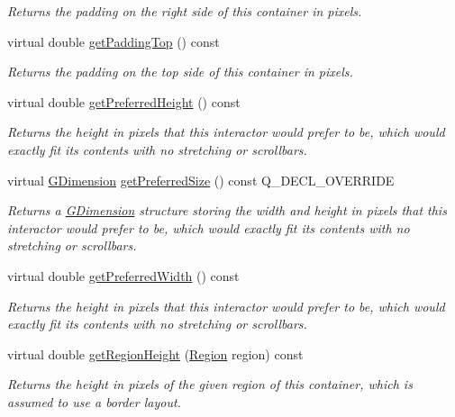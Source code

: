 \begin{DoxyCompactItemize}
\begin{DoxyCompactList}\small\item\em Returns the padding on the right side of this container in pixels. \end{DoxyCompactList}\item 
virtual double \mbox{\hyperlink{classGContainer_ada97c35b2f3366886a49d63fff9d7bd4}{get\+Padding\+Top}} () const
\begin{DoxyCompactList}\small\item\em Returns the padding on the top side of this container in pixels. \end{DoxyCompactList}\item 
virtual double \mbox{\hyperlink{classGInteractor_a747de0961653847bdc6615dbf756d715}{get\+Preferred\+Height}} () const
\begin{DoxyCompactList}\small\item\em Returns the height in pixels that this interactor would prefer to be, which would exactly fit its contents with no stretching or scrollbars. \end{DoxyCompactList}\item 
virtual \mbox{\hyperlink{classGDimension}{G\+Dimension}} \mbox{\hyperlink{classGContainer_a21904b305edacd8f871d6951cb8d3fa5}{get\+Preferred\+Size}} () const Q\+\_\+\+D\+E\+C\+L\+\_\+\+O\+V\+E\+R\+R\+I\+DE
\begin{DoxyCompactList}\small\item\em Returns a \mbox{\hyperlink{classGDimension}{G\+Dimension}} structure storing the width and height in pixels that this interactor would prefer to be, which would exactly fit its contents with no stretching or scrollbars. \end{DoxyCompactList}\item 
virtual double \mbox{\hyperlink{classGInteractor_a82bca31d37700fb0e35d2743352efd5e}{get\+Preferred\+Width}} () const
\begin{DoxyCompactList}\small\item\em Returns the height in pixels that this interactor would prefer to be, which would exactly fit its contents with no stretching or scrollbars. \end{DoxyCompactList}\item 
virtual double \mbox{\hyperlink{classGContainer_a164d248057318961e7f2abc8c3477d63}{get\+Region\+Height}} (\mbox{\hyperlink{classGContainer_a81a01a86de31071a92e6cce0bab9bc4b}{Region}} region) const
\begin{DoxyCompactList}\small\item\em Returns the height in pixels of the given region of this container, which is assumed to use a border layout. \end{DoxyCompactList}\item 

\end{DoxyCompactItemize}

